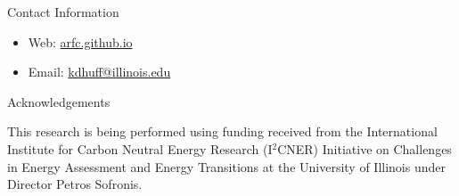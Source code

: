 \documentclass[final]{beamer}
\newlength{\onecolwid}
\newlength{\threecolwid}
\begin{document}
\begin{frame}[t]
\begin{columns}[t,totalwidth=\threecolwid]
\begin{column}{\onecolwid}

\begin{alertblock}{Contact Information}
\begin{itemize}
	\item Web: \href{arfc.github.io}{arfc.github.io}
	\item Email: \href{mailto:kdhuff@illinois.edu}{kdhuff@illinois.edu}
\end{itemize}

\end{alertblock}



\begin{block}{Acknowledgements}

This research is being performed using funding received
from the International Institute for Carbon Neutral Energy Research (I$^2$CNER) 
Initiative on Challenges in Energy Assessment and Energy Transitions at  the  
University of Illinois under Director Petros Sofronis.


\end{block}
\end{column}
\end{columns}
\end{frame}
\end{document}
